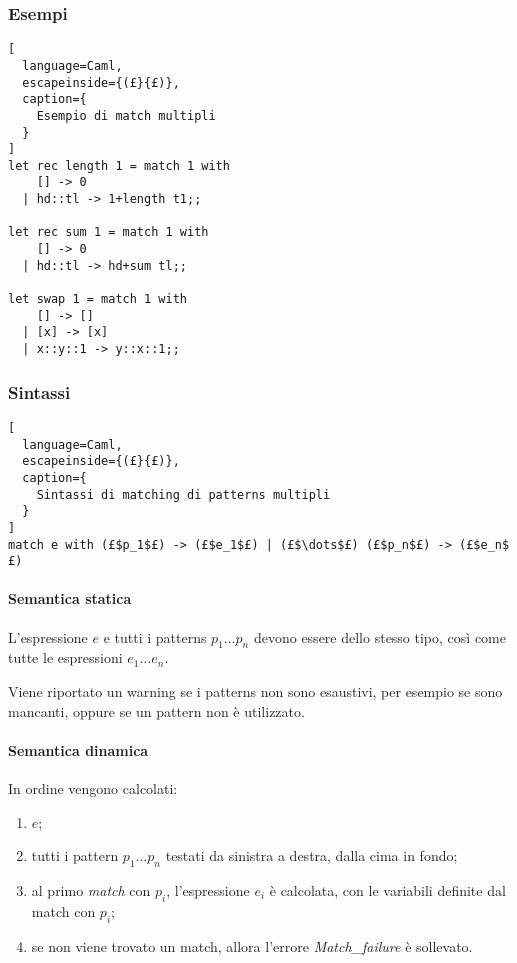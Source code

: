 \subsubsection{Esempi}
\begin{lstlisting}[
  language=Caml,
  escapeinside={(£}{£)},
  caption={
    Esempio di match multipli
  }
]
let rec length 1 = match 1 with
    [] -> 0
  | hd::tl -> 1+length t1;;

let rec sum 1 = match 1 with
    [] -> 0
  | hd::tl -> hd+sum tl;;

let swap 1 = match 1 with
    [] -> []
  | [x] -> [x]
  | x::y::1 -> y::x::1;;
\end{lstlisting}

\subsubsection{Sintassi}
\begin{lstlisting}[
  language=Caml,
  escapeinside={(£}{£)},
  caption={
    Sintassi di matching di patterns multipli
  }
]
match e with (£$p_1$£) -> (£$e_1$£) | (£$\dots$£) (£$p_n$£) -> (£$e_n$£)
\end{lstlisting}

\paragraph{Semantica statica}
L'espressione $e$ e tutti i patterns $p_1\dots p_n$ devono essere dello stesso
tipo, così come tutte le espressioni $e_1\dots e_n$.


Viene riportato un warning se i patterns non sono esaustivi, per esempio
se sono mancanti, oppure se un pattern non è utilizzato.

\paragraph{Semantica dinamica}
In ordine vengono calcolati:
\begin{enumerate}
  \item $e$;
  \item tutti i pattern $p_1\dots p_n$ testati da sinistra a destra, dalla cima
    in fondo;
  \item al primo \emph{match} con $p_i$, l'espressione $e_i$ è calcolata,
    con le variabili definite dal match con $p_i$;
  \item se non viene trovato un match, allora l'errore \emph{Match\_failure}
    è sollevato.
\end{enumerate}

